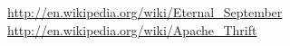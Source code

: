 \documentclass[11pt,letterpaper]{article}
\begin{document}
\begin{thebibliography}{13}





   \url{http://en.wikipedia.org/wiki/Eternal\_September}
   \url{http://en.wikipedia.org/wiki/Apache\_Thrift}
\end{thebibliography}
\end{document}
